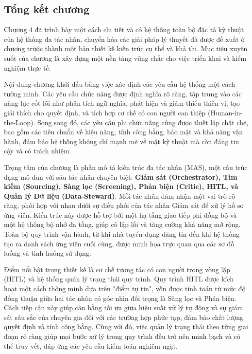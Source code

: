 \documentclass{article}
\begin{document}
\begin{itemize}[topsep=0pt, itemsep=4pt, leftmargin=40pt]
\subsection{Tổng kết chương}
Chương 4 đã trình bày một cách chi tiết và có hệ thống toàn bộ đặc tả kỹ thuật của hệ thống đa tác nhân, chuyển hóa các giải pháp lý thuyết đã được đề xuất ở chương trước thành một bản thiết kế kiến trúc cụ thể và khả thi. Mục tiêu xuyên suốt của chương là xây dựng một nền tảng vững chắc cho việc triển khai và kiểm nghiệm thực tế.

Nội dung chương khởi đầu bằng việc xác định các yêu cầu hệ thống một cách tường minh. Các yêu cầu chức năng được định nghĩa rõ ràng, tập trung vào các năng lực cốt lõi như phân tích ngữ nghĩa, phát hiện và giảm thiểu thiên vị, tạo giải thích cho quyết định, và tích hợp cơ chế có con người can thiệp (Human-in-the-Loop). Song song đó, các yêu cầu phi chức năng cũng được thiết lập chặt chẽ, bao gồm các tiêu chuẩn về hiệu năng, tính công bằng, bảo mật và khả năng vận hành, đảm bảo hệ thống không chỉ mạnh mẽ về mặt kỹ thuật mà còn đáng tin cậy và có trách nhiệm.

Trọng tâm của chương là phần mô tả kiến trúc đa tác nhân (MAS), một cấu trúc dạng mô-đun với sáu tác nhân chuyên biệt: \textbf{Giám sát (Orchestrator), Tìm kiếm (Sourcing), Sàng lọc (Screening), Phản biện (Critic), HITL, và Quản lý Dữ liệu (Data-Steward)}. Mỗi tác nhân đảm nhận một vai trò rõ ràng, phối hợp với nhau dưới sự điều phối của tác nhân Giám sát để xử lý hồ sơ ứng viên. Kiến trúc này được hỗ trợ bởi một hạ tầng giao tiếp phi đồng bộ và một hệ thống bộ nhớ đa tầng, giúp cô lập lỗi và tăng cường khả năng mở rộng. Toàn bộ quy trình vận hành, từ khi nhà tuyển dụng đăng tin đến khi hệ thống tạo ra danh sách ứng viên cuối cùng, được minh họa trực quan qua các sơ đồ luồng và tình huống sử dụng.

Điểm nổi bật trong thiết kế là cơ chế tương tác có con người trong vòng lặp (HITL) và hệ thống quản lý trạng thái quy trình. Quy trình HITL được kích hoạt một cách thông minh dựa trên "điểm tự tin", vốn được tính toán từ mức độ đồng thuận giữa hai tác nhân có góc nhìn đối trọng là Sàng lọc và Phản biện. Cách tiếp cận này giúp cân bằng tối ưu giữa hiệu suất xử lý tự động và sự giám sát sâu sắc của chuyên gia đối với các trường hợp phức tạp, đảm bảo chất lượng quyết định và tính công bằng. Cùng với đó, việc quản lý trạng thái theo từng giai đoạn rõ ràng giúp mọi bước xử lý trong quy trình đều trở nên minh bạch và có thể truy vết, đáp ứng các yêu cầu kiểm toán nghiêm ngặt.


\end{itemize}
\end{document}

